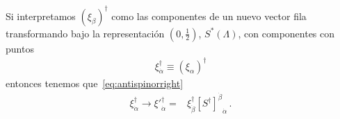 \begin{frame}
Si interpretamos  $\left( \xi_\beta \right)^{\dagger}$ como las componentes de un nuevo vector fila transformando bajo la representación $(0,\frac{1}{2})$,
 $S^{*}(\Lambda)$, con componentes con puntos
\begin{align}
 \xi_{\dot{\alpha}}^{\dagger}\equiv \left( \xi_\alpha \right)^{\dagger}
\end{align}
entonces tenemos que~\eqref{eq:antispinorright}
\begin{align}
{\xi}_{\dot{\alpha}}^{\dagger}\to  {\xi'}_{\dot{\alpha}}^{\dagger}=& \xi_{\dot{\beta}}^{\dagger}{\left[{S^{\dagger}}\right]^{\dot{\beta}}}_{\dot{\alpha}}\,.
\end{align}
\end{frame}

